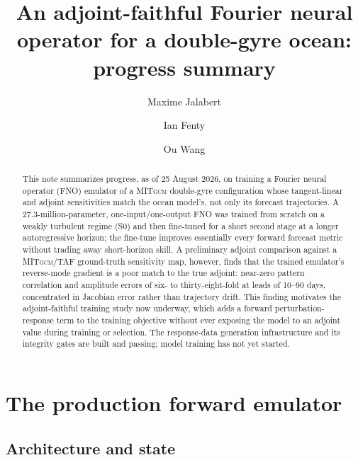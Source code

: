 \documentclass[3p,12pt]{elsarticle}
\newcommand{\MITgcm}{\textsc{MITgcm}}
\newcommand{\FNO}{FNO}
\begin{document}
\begin{frontmatter}

\title{An adjoint-faithful Fourier neural operator for a double-gyre ocean:\\ progress summary}

\author[ucsb]{Maxime Jalabert}
\author[jpl]{Ian Fenty}
\author[jpl]{Ou Wang}


\begin{abstract}
This note summarizes progress, as of 25 August 2026, on training a Fourier neural
operator (\FNO) emulator of a \MITgcm{} double-gyre configuration whose
tangent-linear and adjoint sensitivities match the ocean model's, not only its
forecast trajectories. A 27.3-million-parameter, one-input/one-output \FNO{} was
trained from scratch on a weakly turbulent regime (S0) and then fine-tuned for a
short second stage at a longer autoregressive horizon; the fine-tune improves
essentially every forward forecast metric without trading away short-horizon
skill. A preliminary adjoint comparison against a \MITgcm{}/TAF ground-truth
sensitivity map, however, finds that the trained emulator's reverse-mode gradient
is a poor match to the true adjoint: near-zero pattern correlation and amplitude
errors of six- to thirty-eight-fold at leads of 10--90 days, concentrated in
Jacobian error rather than trajectory drift. This finding motivates the
adjoint-faithful training study now underway, which adds a forward
perturbation-response term to the training objective without ever exposing the
model to an adjoint value during training or selection. The response-data
generation infrastructure and its integrity gates are built and passing; model
training has not yet started.
\end{abstract}

\end{frontmatter}

\section{The production forward emulator}
\label{sec:emulator}

\subsection{Architecture and state}
\end{document}
